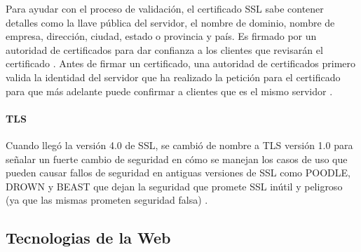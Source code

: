 Para ayudar con el proceso de validación, el certificado SSL sabe contener detalles como la llave pública del servidor, el nombre de dominio, nombre de empresa, dirección, ciudad, estado o provincia y país. Es firmado por un autoridad de certificados para dar confianza a los clientes que revisarán el certificado \citep{info.SSL.com-SSL}. Antes de firmar un certificado, una autoridad de certificados primero valida la identidad del servidor que ha realizado la petición para el certificado para que más adelante puede confirmar a clientes que es el mismo servidor \citep{GlobalSign-SSL}.

\paragraph{TLS}
Cuando llegó la versión 4.0 de SSL, se cambió de nombre a TLS versión 1.0 \citep{DigiCert-SSL} para señalar un fuerte cambio de seguridad en cómo se manejan los casos de uso que pueden causar fallos de seguridad en antiguas versiones de SSL como POODLE, DROWN y BEAST que dejan la seguridad que promete SSL inútil y peligroso (ya que las mismas prometen seguridad falsa) \citep{LuxSci-SSL-vs-TLS} \citep{GlobalSign-SSL-vs-TLS}.

\subsection{Tecnologias de la Web}


